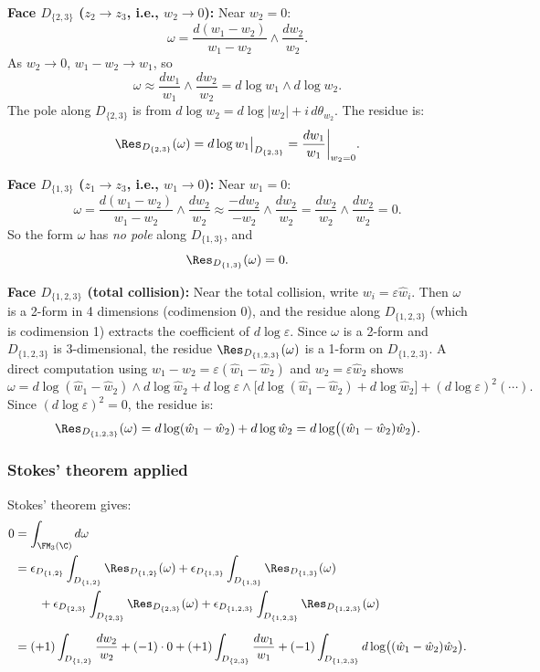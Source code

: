 \textbf{Face $D_{\{2,3\}}$ ($z_2\to z_3$, i.e., $w_2\to 0$):}
Near $w_2 = 0$:
\[
\omega = \frac{d(w_1-w_2)}{w_1-w_2}\wedge\frac{dw_2}{w_2}.
\]
As $w_2\to 0$, $w_1 - w_2 \to w_1$, so
\[
\omega \approx \frac{dw_1}{w_1}\wedge\frac{dw_2}{w_2} = d\log w_1\wedge d\log w_2.
\]
The pole along $D_{\{2,3\}}$ is from $d\log w_2 = d\log|w_2| + i\,d\theta_{w_2}$. The residue is:
\[
\Res_{D_{\{2,3\}}}(\omega) = d\log w_1\big|_{D_{\{2,3\}}} = \frac{dw_1}{w_1}\bigg|_{w_2=0}.
\]

\textbf{Face $D_{\{1,3\}}$ ($z_1\to z_3$, i.e., $w_1\to 0$):}
Near $w_1 = 0$:
\[
\omega = \frac{d(w_1-w_2)}{w_1-w_2}\wedge\frac{dw_2}{w_2} \approx \frac{-dw_2}{-w_2}\wedge\frac{dw_2}{w_2} = \frac{dw_2}{w_2}\wedge\frac{dw_2}{w_2} = 0.
\]
So the form $\omega$ has \emph{no pole} along $D_{\{1,3\}}$, and
\[
\Res_{D_{\{1,3\}}}(\omega) = 0.
\]

\textbf{Face $D_{\{1,2,3\}}$ (total collision):}
Near the total collision, write $w_i = \varepsilon\hat{w}_i$. Then $\omega$ is a 2-form in 4 dimensions (codimension 0), and the residue along $D_{\{1,2,3\}}$ (which is codimension 1) extracts the coefficient of $d\log\varepsilon$. Since $\omega$ is a 2-form and $D_{\{1,2,3\}}$ is 3-dimensional, the residue $\Res_{D_{\{1,2,3\}}}(\omega)$ is a 1-form on $D_{\{1,2,3\}}$. A direct computation using $w_1 - w_2 = \varepsilon(\hat{w}_1-\hat{w}_2)$ and $w_2 = \varepsilon\hat{w}_2$ shows
\[
\omega = d\log(\hat{w}_1-\hat{w}_2)\wedge d\log\hat{w}_2 + d\log\varepsilon\wedge\bigl[d\log(\hat{w}_1-\hat{w}_2) + d\log\hat{w}_2\bigr] + (d\log\varepsilon)^2(\cdots).
\]
Since $(d\log\varepsilon)^2 = 0$, the residue is:
\[
\Res_{D_{\{1,2,3\}}}(\omega) = d\log(\hat{w}_1-\hat{w}_2) + d\log\hat{w}_2 = d\log\bigl((\hat{w}_1-\hat{w}_2)\hat{w}_2\bigr).
\]

\subsubsection{Stokes' theorem applied}

Stokes' theorem gives:
\begin{align*}
0 &= \int_{\FM_3(\C)} d\omega\\
&= \epsilon_{D_{\{1,2\}}}\int_{D_{\{1,2\}}}\Res_{D_{\{1,2\}}}(\omega) + \epsilon_{D_{\{1,3\}}}\int_{D_{\{1,3\}}}\Res_{D_{\{1,3\}}}(\omega)\\
&\qquad + \epsilon_{D_{\{2,3\}}}\int_{D_{\{2,3\}}}\Res_{D_{\{2,3\}}}(\omega) + \epsilon_{D_{\{1,2,3\}}}\int_{D_{\{1,2,3\}}}\Res_{D_{\{1,2,3\}}}(\omega)\\[6pt]
&= (+1)\int_{D_{\{1,2\}}}\frac{dw_2}{w_2} + (-1)\cdot 0 + (+1)\int_{D_{\{2,3\}}}\frac{dw_1}{w_1} + (-1)\int_{D_{\{1,2,3\}}}d\log\bigl((\hat{w}_1-\hat{w}_2)\hat{w}_2\bigr).
\end{align*}

